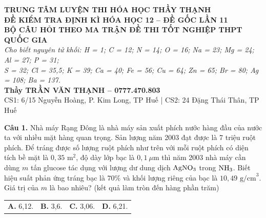 \documentclass{article}
\begin{document}

\begin{center}
\vspace*{0.5cm}
{\fontsize{24}{30}\selectfont \textbf{TRUNG TÂM LUYỆN THI HÓA HỌC THẦY THẠNH}}\\[0.6cm]
{\fontsize{34}{42}\selectfont \textbf{\color{brandGreen}ĐỀ KIỂM TRA ĐỊNH KÌ HÓA HỌC 12 -- ĐỀ GỐC LẦN 11}}\\[0.4cm]
{\fontsize{26}{34}\selectfont \textbf{BỘ CÂU HỎI THEO MA TRẬN ĐỀ THI TỐT NGHIỆP THPT QUỐC GIA}}\\[0.6cm]
{\fontsize{21}{27}\selectfont \textit{Cho biết nguyên tử khối: H = 1; C = 12; N = 14; O = 16; Na = 23; Mg = 24; Al = 27; P = 31;}}\\[0.15cm]
{\fontsize{21}{27}\selectfont \textit{S = 32; Cl = 35,5; K = 39; Ca = 40; Fe = 56; Cu = 64; Zn = 65; Br = 80; Ag = 108; Ba = 137.}}\\[0.8cm]
{\fontsize{24}{30}\selectfont \textbf{\color{brandRed}Thầy TRẦN VĂN THẠNH -- 0777.470.803}}\\[0.3cm]
{\fontsize{20}{26}\selectfont CS1: 6/15 Nguyễn Hoàng, P. Kim Long, TP Huế \quad | \quad CS2: 24 Đặng Thái Thân, TP Huế}
\end{center}
\newpage


\fontsize{27}{36}\selectfont
\textbf{Câu 1.} Nhà máy Rạng Đông là nhà máy sản xuất phích nước hàng đầu của nước ta với nhiều mặt hàng quan trọng. Sản lượng năm 2003 đạt được là 7 triệu ruột phích. Để tráng được số lượng ruột phích như trên với mỗi ruột phích có diện tích bề mặt là $0{,}35\text{ m}^2$, độ dày lớp bạc là $0{,}1\ \mu\text{m}$ thì năm 2003 nhà máy cần dùng $m$ tấn glucose tác dụng với lượng dư dung dịch $\ce{AgNO3}$ trong $\ce{NH3}$. Biết hiệu suất phản ứng tráng bạc là $70\%$ và khối lượng riêng của bạc là $10{,}49\text{ g/cm}^3$. Giá trị của $m$ là bao nhiêu? (kết quả làm tròn đến hàng phần trăm)
\vspace{16pt}

\begin{tabularx}{\linewidth}{@{}X X X X@{}}
\textbf{A.} 6,12. & \textbf{B.} 3,6. & \textbf{C.} 3,06. & \textbf{D.} 6,21.
\end{tabularx}
\vspace*{\fill}
\newpage
\end{document}
